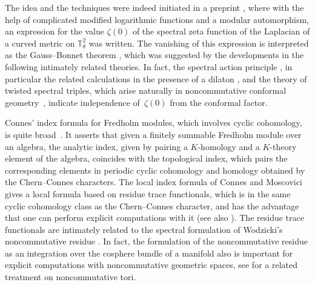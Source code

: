 \documentclass[pdftex]{sigma}
\numberwithin{equation}{section}
\begin{document}
The idea and the techniques were indeed initiated in a preprint \cite{PreprintCC},
where with the help of complicated modif\/ied logarithmic
functions and a modular automorphism, an expression for the
value $\zeta(0)$ of the spectral zeta function of the Laplacian
of a curved metric on $\mathbb{T}^2_\theta$ was written. The vanishing of this expression is
interpreted as the Gauss--Bonnet theorem \cite{GaussBonnet-ConnesTretkoff},
which was suggested by the developments in the following intimately
related theories. In fact, the spectral action principle \cite{SpActChC},
in particular the related calculations in the presence of a dilaton
\cite{SpActScaleChC}, and the theory of twisted spectral triples,
which arise naturally in noncommutative conformal geo\-met\-ry~\cite{TrSpTypeIII, NCConformalPW}, indicate independence of~$\zeta(0)$
from the conformal factor.

Connes' index formula for Fredholm modules, which involves cyclic cohomology,
is quite broad~\cite{IHES}. It asserts that given a f\/initely summable Fredholm module over
an algebra, the analytic index, given by pairing a
$K$-homology and a $K$-theory element of the
algebra, coincides with the topological index, which pairs
the corresponding elements in periodic cyclic cohomology and homology obtained
by the Chern--Connes characters. The local index formula of Connes and Moscovici \cite{localtrace95}
gives a local formula based on residue trace functionals, which is in the same cyclic cohomology
class as the Chern--Connes character, and has the advantage that one can perform
explicit computations with it (see also \cite{localHig}). The residue trace functionals are intimately related to
the spectral formulation of Wodzicki's noncommutative residue \cite{LocalInvarW, NCResidue1W}. In fact,
the formulation of the noncommutative residue as an integration over
the cosphere bundle of a manifold also is important for explicit computations
with noncommutative geometric spaces, see \cite{Residue4NCTF, ScalarCurv4NCTFK, NCResidueFW}
for a related treatment on noncommutative tori.
\end{document}
